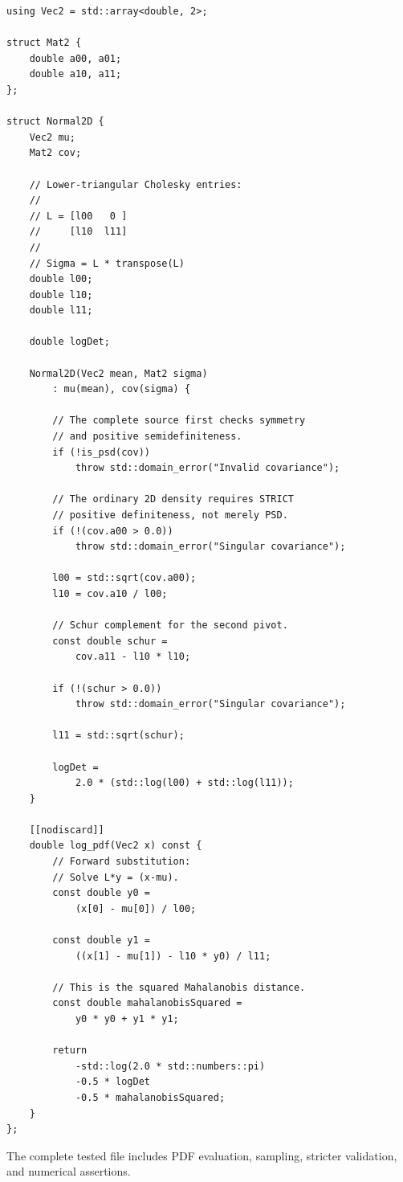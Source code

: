 \begin{verbatim}
using Vec2 = std::array<double, 2>;

struct Mat2 {
    double a00, a01;
    double a10, a11;
};

struct Normal2D {
    Vec2 mu;
    Mat2 cov;

    // Lower-triangular Cholesky entries:
    //
    // L = [l00   0 ]
    //     [l10  l11]
    //
    // Sigma = L * transpose(L)
    double l00;
    double l10;
    double l11;

    double logDet;

    Normal2D(Vec2 mean, Mat2 sigma)
        : mu(mean), cov(sigma) {

        // The complete source first checks symmetry
        // and positive semidefiniteness.
        if (!is_psd(cov))
            throw std::domain_error("Invalid covariance");

        // The ordinary 2D density requires STRICT
        // positive definiteness, not merely PSD.
        if (!(cov.a00 > 0.0))
            throw std::domain_error("Singular covariance");

        l00 = std::sqrt(cov.a00);
        l10 = cov.a10 / l00;

        // Schur complement for the second pivot.
        const double schur =
            cov.a11 - l10 * l10;

        if (!(schur > 0.0))
            throw std::domain_error("Singular covariance");

        l11 = std::sqrt(schur);

        logDet =
            2.0 * (std::log(l00) + std::log(l11));
    }

    [[nodiscard]]
    double log_pdf(Vec2 x) const {
        // Forward substitution:
        // Solve L*y = (x-mu).
        const double y0 =
            (x[0] - mu[0]) / l00;

        const double y1 =
            ((x[1] - mu[1]) - l10 * y0) / l11;

        // This is the squared Mahalanobis distance.
        const double mahalanobisSquared =
            y0 * y0 + y1 * y1;

        return
            -std::log(2.0 * std::numbers::pi)
            -0.5 * logDet
            -0.5 * mahalanobisSquared;
    }
};
\end{verbatim}

The complete tested file includes PDF evaluation, sampling, stricter validation, and numerical assertions.

